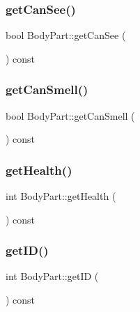 \mbox{\label{class_body_part_ab1a17aec7b3aa4d388fb9c8421cdc519}} 
\subsubsection{\texorpdfstring{get\+Can\+See()}{getCanSee()}}
{\footnotesize\ttfamily bool Body\+Part\+::get\+Can\+See (\begin{DoxyParamCaption}{ }\end{DoxyParamCaption}) const}

\mbox{\label{class_body_part_a9a954b18bd4bee1a8a2dea9d3464fd29}} 
\subsubsection{\texorpdfstring{get\+Can\+Smell()}{getCanSmell()}}
{\footnotesize\ttfamily bool Body\+Part\+::get\+Can\+Smell (\begin{DoxyParamCaption}{ }\end{DoxyParamCaption}) const}

\mbox{\label{class_body_part_a3d5dd1bc03733a80fc0058dcbd6cddd8}} 
\subsubsection{\texorpdfstring{get\+Health()}{getHealth()}}
{\footnotesize\ttfamily int Body\+Part\+::get\+Health (\begin{DoxyParamCaption}{ }\end{DoxyParamCaption}) const}

\mbox{\label{class_body_part_a3fd271dfacdd0f34b80e287d532dea64}} 
\subsubsection{\texorpdfstring{get\+I\+D()}{getID()}}
{\footnotesize\ttfamily int Body\+Part\+::get\+ID (\begin{DoxyParamCaption}{ }\end{DoxyParamCaption}) const}

